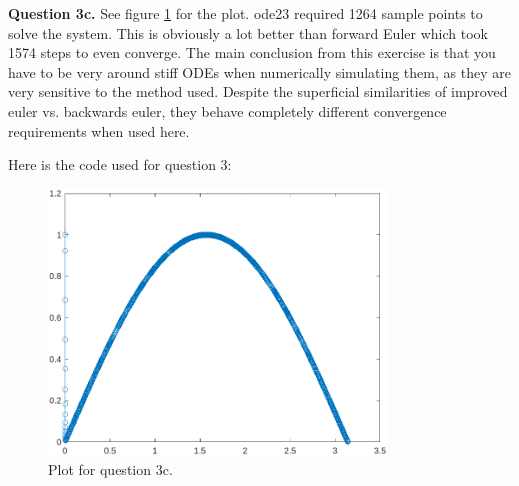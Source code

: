 \documentclass[letterpaper, reqno,11pt]{article}
\begin{document}
{\medskip\noindent\bf Question 3c.} See figure \ref{fig:q3c} for the plot. ode23 required 1264 sample points to solve the system. This is obviously a lot better than forward Euler which took 1574 steps to even converge. The main conclusion from this exercise is that you have to be very around stiff ODEs when numerically simulating them, as they are very sensitive to the method used. Despite the superficial similarities of improved euler vs. backwards euler, they behave completely different convergence requirements when used here.

Here is the code used for question 3:

\begin{figure}[htpb]
    \centering
    \includegraphics[width=0.8\textwidth]{q3c}
    \caption{Plot for question 3c.}
    \label{fig:q3c}
\end{figure}
\end{document}

